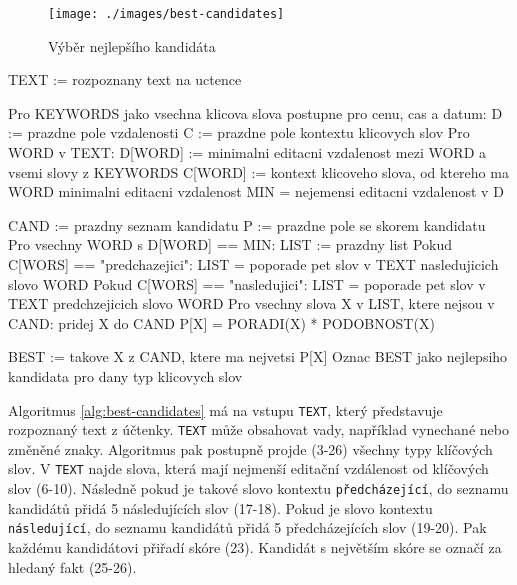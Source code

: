 \documentclass[thesis=B,czech]{FITthesis}[2019/12/23]
\def\myit#1{\texttt{#1}}
\def\pred{\texttt{předcházející}}
\def\po{\texttt{následující}}
\begin{document}
\begin{figure}[!h]
	\centering
	\texttt{[image: ./images/best-candidates]}
	\caption{Výběr nejlepšího kandidáta}
	\label{fig:best-candidates}
\end{figure}

\pagebreak
\begin{algorithm}[caption={Nejlepší kandidáti}, label={alg:best-candidates}]
TEXT := rozpoznany text na uctence

Pro KEYWORDS jako vsechna klicova slova postupne pro cenu, cas a datum:
  D := prazdne pole vzdalenosti
  C := prazdne pole kontextu klicovych slov
  Pro WORD v TEXT:
    D[WORD] := minimalni editacni vzdalenost mezi WORD
                  a vsemi slovy z KEYWORDS
    C[WORD] := kontext klicoveho slova,
                  od ktereho ma WORD minimalni editacni vzdalenost
    MIN = nejemensi editacni vzdalenost v D

    CAND := prazdny seznam kandidatu
    P := prazdne pole se skorem kandidatu
    Pro vsechny WORD s D[WORD] == MIN:
      LIST := prazdny list
      Pokud C[WORS] == "predchazejici":
        LIST = poporade pet slov v TEXT nasledujicich slovo WORD
      Pokud C[WORS] == "nasledujici":
        LIST = poporade pet slov v TEXT predchzejicich slovo WORD
      Pro vsechny slova X v LIST, ktere nejsou v CAND:
        pridej X do CAND
        P[X] = PORADI(X) * PODOBNOST(X)

  BEST := takove X z CAND, ktere ma nejvetsi P[X]
  Oznac BEST jako nejlepsiho kandidata pro dany typ klicovych slov
\end{algorithm}

Algoritmus \ref{alg:best-candidates} má na vstupu \myit{TEXT}, který představuje rozpoznaný text z úč\-ten\-ky. \myit{TEXT} může obsahovat vady, například vynechané nebo změněné znaky. Algoritmus pak postupně projde (\textsf{3-26}) všechny typy klíčových slov. V \myit{TEXT} najde slova, která mají nejmenší editační vzdálenost od klíčových slov (\textsf{6-10}). Následně pokud je takové slovo kontextu \pred{}, do seznamu kandidátů přidá 5 následujících slov (\textsf{17-18}). Pokud je slovo kontextu \po{}, do seznamu kandidátů přidá 5 předcházejících slov (\textsf{19-20}). Pak každému kandidátovi přiřadí skóre (\textsf{23}). Kandidát s největším skóre se označí za hledaný fakt (\textsf{25-26}).
\end{document}
